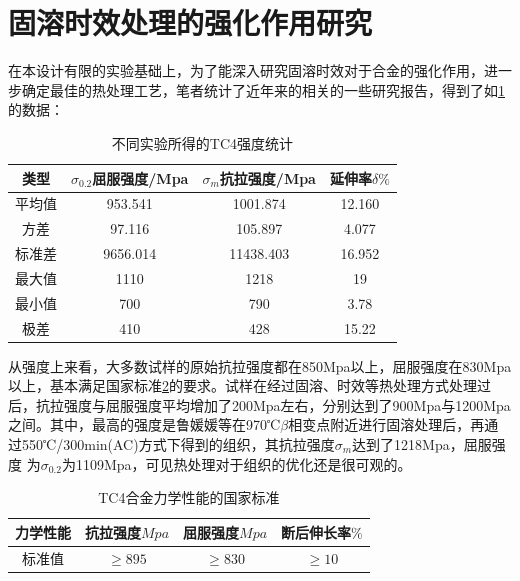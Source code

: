 
\section{固溶时效处理的强化作用研究}
在本设计有限的实验基础上，为了能深入研究固溶时效对于\ti 合金的强化作用，进一步确定最佳的热处理工艺，笔者统计了近年来的相关的一些研究报告，得到了如\ref{sec:mytcstrengthave}的数据：
\begin{table}[htbp]
	\centering
	\caption{不同实验所得的TC4强度统计}
	\label{sec:mytcstrengthave}
	\begin{tabular}{cccc}
		\toprule
		类型& $ \sigma_{0.2} $屈服强度/Mpa  &$ \sigma_m $抗拉强度/Mpa &延伸率$ \delta \% $ \\ \midrule
		平均值 & 953.541& 1001.874&12.160 \\
		方差 &97.116& 105.897& 4.077 \\
		标准差 &9656.014&11438.403&16.952 \\
		最大值 &  1110 & 1218 & 19 \\
		最小值&700 & 790 & 3.78 \\
		极差&410 & 428 & 15.22 \\
		\bottomrule
	\end{tabular}
\end{table}


从强度上来看，大多数试样的原始抗拉强度都在850Mpa以上，屈服强度在830Mpa以上，基本满足国家标准\ref{sec:mytc4machins}的要求。试样在经过固溶、时效等热处理方式处理过后，抗拉强度与屈服强度平均增加了200Mpa左右，分别达到了900Mpa与1200Mpa之间。其中，最高的强度是鲁媛媛等\cite{luyuanyuanShixiaochuliduiTC4taihejinweiguanzuzhihelixuexingnengdeyingxiang2019}在970℃$ \beta $相变点附近进行固溶处理后，再通过550℃/300min(AC)方式下得到的组织，其抗拉强度$ \sigma_m $达到了1218Mpa，屈服强度%
为$ \sigma_{0.2} $为1109Mpa，可见热处理对于组织的优化还是很可观的。
\begin{table}[htbp]
	\centering
	\caption{TC4合金力学性能的国家标准}
	\label{sec:mytc4machins}
	\begin{tabular}{cccc}
		\toprule
		力学性能& 抗拉强度$Mpa  $& 屈服强度$ Mpa $&断后伸长率$ \% $\\ \midrule
		标准值 &$ \ge 895 $&$ \ge 830 $&$ \ge 10 $ \\ \bottomrule
	\end{tabular}
\end{table}


